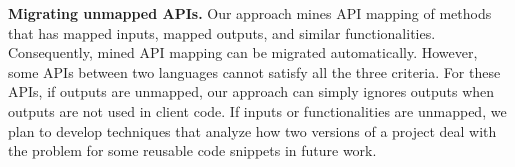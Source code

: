 \textbf{Migrating unmapped APIs.} Our approach mines API mapping of
methods that has mapped inputs, mapped outputs, and similar
functionalities. Consequently, mined API mapping can be migrated
automatically. However, some APIs between two languages cannot
satisfy all the three criteria. For these APIs, if outputs are
unmapped, our approach can simply ignores outputs when outputs are
not used in client code. If inputs or functionalities are unmapped,
we plan to develop techniques that analyze how two versions of a
project deal with the problem for some reusable code snippets in
future work.
